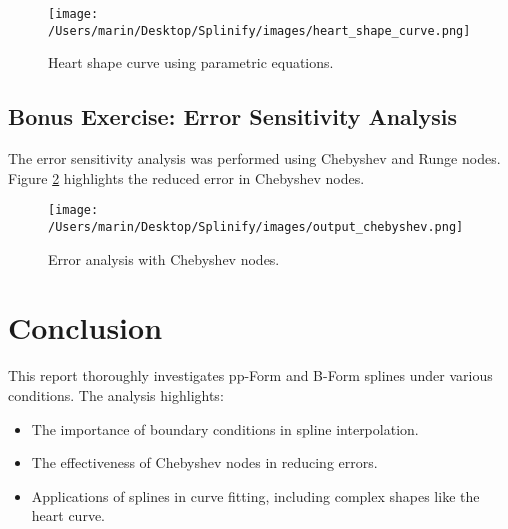 \documentclass[11pt,a4paper]{article}
\begin{document}
\begin{figure}[h!]
    \centering
    \texttt{[image: /Users/marin/Desktop/Splinify/images/heart\_shape\_curve.png]}
    \caption{Heart shape curve using parametric equations.}
    \label{fig:heart_shape}
\end{figure}

\subsection{Bonus Exercise: Error Sensitivity Analysis}
The error sensitivity analysis was performed using Chebyshev and Runge nodes. Figure \ref{fig:error_analysis} highlights the reduced error in Chebyshev nodes.

\begin{figure}[h!]
    \centering
    \texttt{[image: /Users/marin/Desktop/Splinify/images/output\_chebyshev.png]}
    \caption{Error analysis with Chebyshev nodes.}
    \label{fig:error_analysis}
\end{figure}

\section{Conclusion}
This report thoroughly investigates pp-Form and B-Form splines under various conditions. The analysis highlights:
\begin{itemize}
    \item The importance of boundary conditions in spline interpolation.
    \item The effectiveness of Chebyshev nodes in reducing errors.
    \item Applications of splines in curve fitting, including complex shapes like the heart curve.
\end{itemize}
\end{document}

